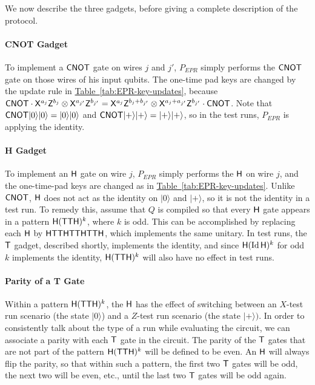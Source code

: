 \documentclass[11pt]{article}
\numberwithin{equation}{section}
\theoremstyle{definition}
\theoremstyle{plain}
\newcommand{\expref}[2]{\hyperref[#2]{#1~\ref{#2}}}
\newcommand{\ket}[1]{|#1\rangle}
\newcommand{\Id}{\ensuremath{\mathop{\rm Id}\nolimits}}
\begin{document}
We now describe the three gadgets, before giving a complete description of the protocol. 

\paragraph{CNOT Gadget} To implement a $\sf CNOT$ gate on wires $j$ and $j'$, $P_{EPR}$ simply performs the $\sf CNOT$ gate on those wires of his input qubits. The one-time pad keys are changed by the update rule in \expref{Table}{tab:EPR-key-updates}, because ${\sf CNOT}\cdot {\sf X}^{a_j}{\sf Z}^{b_j}\otimes {\sf X}^{a_{j'}}{\sf Z}^{b_{j'}}={\sf X}^{a_j}{\sf Z}^{b_j+b_{j'}}\otimes {\sf X}^{a_j+a_{j'}}{\sf Z}^{b_{j'}}\cdot {\sf CNOT}$. Note that ${\sf CNOT}\ket{0}\ket{0}=\ket{0}\ket{0}$ and ${\sf CNOT}\ket{+}\ket{+}=\ket{+}\ket{+}$, so in the test runs, $P_{EPR}$ is applying the identity. 



\paragraph{H Gadget} To implement an $\sf H$ gate on wire $j$, $P_{EPR}$ simply performs the $\sf H$ on wire $j$, and the one-time-pad keys are changed as in \expref{Table}{tab:EPR-key-updates}. Unlike $\sf CNOT$, $\sf H$ does not act as the identity on $\ket{0}$ and $\ket{+}$, so it is not the identity in a test run. To remedy this, assume that $Q$ is compiled so that every $\sf H$ gate appears in a pattern ${\sf H}({\sf TTH})^k$, where $k$ is odd. This can be accomplished by replacing each $\sf H$ by $\sf HTTHTTHTTH$, which implements the same unitary. In test runs, the $\sf T$ gadget, described shortly, implements the identity, and since ${\sf H}(\Id {\sf H})^k$ for odd $k$ implements the identity, ${\sf H}({\sf TTH})^k$ will also have no effect in test runs. 

\paragraph{Parity of a T Gate} Within a pattern ${\sf H}({\sf TTH})^k$, the $\sf H$ has the effect of switching between an $X$-test run scenario (the state $\ket{0}$) and a $Z$-test run scenario (the state $\ket{+})$. In order to consistently talk about the type of a run while evaluating the circuit, we can associate a parity with each $\sf T$ gate in the circuit. The parity of the $\sf T$ gates that are not part of the pattern ${\sf H}({\sf TTH})^k$ will be defined to be even. An ${\sf H}$ will always flip the parity, so that within such a pattern, the first two ${\sf T}$ gates will be odd, the next two will be even, etc., until the last two $\sf T$ gates will be odd again. 
\end{document}
